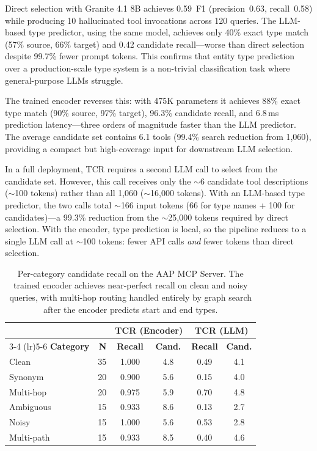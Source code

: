 Direct selection with Granite 4.1 8B achieves 0.59~F1 (precision~0.63, recall~0.58) while producing 10 hallucinated tool invocations across 120 queries.
The LLM-based type predictor, using the same model, achieves only 40\% exact type match (57\% source, 66\% target) and 0.42 candidate recall---worse than direct selection despite 99.7\% fewer prompt tokens.
This confirms that entity type prediction over a production-scale type system is a non-trivial classification task where general-purpose LLMs struggle.

The trained encoder reverses this: with 475K parameters it achieves 88\% exact type match (90\% source, 97\% target), 96.3\% candidate recall, and 6.8\,ms prediction latency---three orders of magnitude faster than the LLM predictor.
The average candidate set contains 6.1 tools (99.4\% search reduction from 1,060), providing a compact but high-coverage input for downstream LLM selection.

In a full deployment, TCR requires a second LLM call to select from the candidate set.
However, this call receives only the ${\sim}$6 candidate tool descriptions (${\sim}$100 tokens) rather than all 1,060 (${\sim}$16,000 tokens).
With an LLM-based type predictor, the two calls total ${\sim}$166 input tokens (66 for type names + 100 for candidates)---a 99.3\% reduction from the ${\sim}$25,000 tokens required by direct selection.
With the encoder, type prediction is local, so the pipeline reduces to a single LLM call at ${\sim}$100 tokens: fewer API calls \emph{and} fewer tokens than direct selection.

\begin{table}[t]
\centering
\small
\begin{tabular}{l r cc cc}
\toprule
& & \multicolumn{2}{c}{\textbf{TCR (Encoder)}} & \multicolumn{2}{c}{\textbf{TCR (LLM)}} \\
\cmidrule(lr){3-4} \cmidrule(lr){5-6}
\textbf{Category} & \textbf{N} & \textbf{Recall} & \textbf{Cand.} & \textbf{Recall} & \textbf{Cand.} \\
\midrule
Clean      & 35 & 1.000 & 4.8 & 0.49 & 4.1 \\
Synonym    & 20 & 0.900 & 5.6 & 0.15 & 4.0 \\
Multi-hop  & 20 & 0.975 & 5.9 & 0.70 & 4.8 \\
Ambiguous  & 15 & 0.933 & 8.6 & 0.13 & 2.7 \\
Noisy      & 15 & 1.000 & 5.6 & 0.53 & 2.8 \\
Multi-path & 15 & 0.933 & 8.5 & 0.40 & 4.6 \\
\bottomrule
\end{tabular}
\caption{Per-category candidate recall on the AAP MCP Server. The trained encoder achieves near-perfect recall on clean and noisy queries, with multi-hop routing handled entirely by graph search after the encoder predicts start and end types.}
\label{tab:aap-category}
\end{table}

